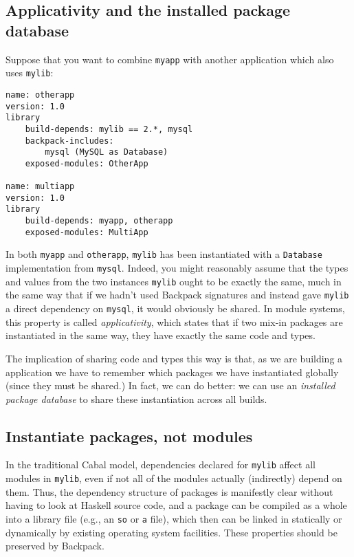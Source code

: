 
\subsection{Applicativity and the installed package database}

Suppose that you want to combine \verb|myapp| with another application
which also uses \verb|mylib|:

\begin{verbatim}
name: otherapp
version: 1.0
library
    build-depends: mylib == 2.*, mysql
    backpack-includes:
        mysql (MySQL as Database)
    exposed-modules: OtherApp

name: multiapp
version: 1.0
library
    build-depends: myapp, otherapp
    exposed-modules: MultiApp
\end{verbatim}

In both \verb|myapp| and \verb|otherapp|, \verb|mylib| has been
instantiated with a \verb|Database| implementation from \verb|mysql|.
Indeed, you might reasonably assume that the types and values from the
two instances \verb|mylib| ought to be exactly the same, much in the
same way that if we hadn't used Backpack signatures and instead gave
\verb|mylib| a direct dependency on \verb|mysql|, it would obviously be
shared.  In module systems, this property is called
\emph{applicativity}, which states that if two mix-in packages are
instantiated in the same way, they have exactly the same code and types.

The implication of sharing code and types this way is that, as we
are building a application we have to remember which packages we have
instantiated globally (since they must be shared.)  In fact, we can
do better: we can use an \emph{installed package database} to share
these instantiation across all builds.

\subsection{Instantiate packages, not modules}
\label{sec:instantiate-pkgs}

In the traditional Cabal model, dependencies declared for \verb|mylib|
affect all modules in \verb|mylib|, even if not all of the modules
actually (indirectly) depend on them.  Thus, the dependency structure of
packages is manifestly clear without having to look at Haskell source
code, and a package can be compiled as a whole into a library file
(e.g., an \verb|so| or \verb|a| file), which then can be linked in
statically or dynamically by existing operating system facilities.
These properties should be preserved by Backpack.

